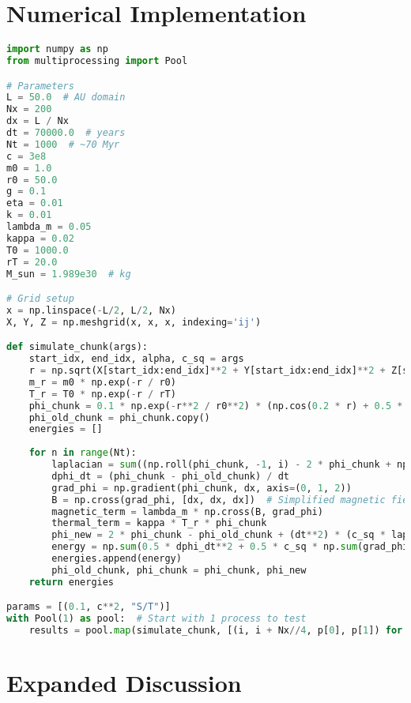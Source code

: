 \documentclass[11pt]{article}
\begin{document}
\section{Numerical Implementation}
\begin{lstlisting}[language=Python, caption={Ehokolo Solar System Formation Simulation}, label=lst:simulation]
import numpy as np
from multiprocessing import Pool

# Parameters
L = 50.0  # AU domain
Nx = 200
dx = L / Nx
dt = 70000.0  # years
Nt = 1000  # ~70 Myr
c = 3e8
m0 = 1.0
r0 = 50.0
g = 0.1
eta = 0.01
k = 0.01
lambda_m = 0.05
kappa = 0.02
T0 = 1000.0
rT = 20.0
M_sun = 1.989e30  # kg

# Grid setup
x = np.linspace(-L/2, L/2, Nx)
X, Y, Z = np.meshgrid(x, x, x, indexing='ij')

def simulate_chunk(args):
    start_idx, end_idx, alpha, c_sq = args
    r = np.sqrt(X[start_idx:end_idx]**2 + Y[start_idx:end_idx]**2 + Z[start_idx:end_idx]**2)
    m_r = m0 * np.exp(-r / r0)
    T_r = T0 * np.exp(-r / rT)
    phi_chunk = 0.1 * np.exp(-r**2 / r0**2) * (np.cos(0.2 * r) + 0.5 * np.cos(0.4 * r) + 0.3 * np.cos(0.3 * r))
    phi_old_chunk = phi_chunk.copy()
    energies = []
    
    for n in range(Nt):
        laplacian = sum((np.roll(phi_chunk, -1, i) - 2 * phi_chunk + np.roll(phi_chunk, 1, i)) / dx**2 for i in range(3))
        dphi_dt = (phi_chunk - phi_old_chunk) / dt
        grad_phi = np.gradient(phi_chunk, dx, axis=(0, 1, 2))
        B = np.cross(grad_phi, [dx, dx, dx])  # Simplified magnetic field
        magnetic_term = lambda_m * np.cross(B, grad_phi)
        thermal_term = kappa * T_r * phi_chunk
        phi_new = 2 * phi_chunk - phi_old_chunk + (dt**2) * (c_sq * laplacian - m_r**2 * phi_chunk - g * phi_chunk**3 - eta * phi_chunk**5 + 8 * np.pi * 6.674e-11 * k * phi_chunk**2 + magnetic_term + thermal_term)
        energy = np.sum(0.5 * dphi_dt**2 + 0.5 * c_sq * np.sum(grad_phi**2, axis=0) + 0.5 * m_r**2 * phi_chunk**2 + 0.25 * g * phi_chunk**4 + (1/6) * eta * phi_chunk**6) * dx**3
        energies.append(energy)
        phi_old_chunk, phi_chunk = phi_chunk, phi_new
    return energies

params = [(0.1, c**2, "S/T")]
with Pool(1) as pool:  # Start with 1 process to test
    results = pool.map(simulate_chunk, [(i, i + Nx//4, p[0], p[1]) for i in range(0, Nx, Nx//4) for p in params])
\end{lstlisting}

\section{Expanded Discussion}
\end{document}
